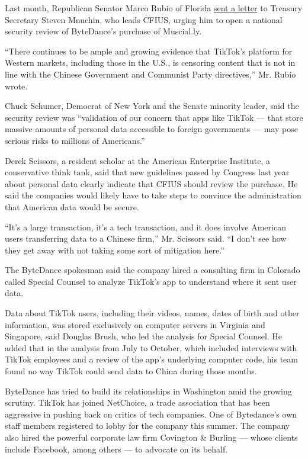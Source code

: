 Last month, Republican Senator Marco Rubio of Florida
\href{https://www.rubio.senate.gov/public/_cache/files/9ba023e4-2f4b-404a-a8c0-e87ea784f440/FCEFFE1F54F3899795B4E5F1F1804630.20191009-letter-to-secretary-mnuchin-re-tiktok.pdf}{sent
a letter} to Treasury Secretary Steven Mnuchin, who leads CFIUS, urging
him to open a national security review of ByteDance's purchase of
Muscial.ly.

``There continues to be ample and growing evidence that TikTok's
platform for Western markets, including those in the U.S., is censoring
content that is not in line with the Chinese Government and Communist
Party directives,'' Mr. Rubio wrote.

Chuck Schumer, Democrat of New York and the Senate minority leader, said
the security review was ``validation of our concern that apps like
TikTok --- that store massive amounts of personal data accessible to
foreign governments --- may pose serious risks to millions of
Americans.''

Derek Scissors, a resident scholar at the American Enterprise Institute,
a conservative think tank, said that new guidelines passed by Congress
last year about personal data clearly indicate that CFIUS should review
the purchase. He said the companies would likely have to take steps to
convince the administration that American data would be secure.

``It's a large transaction, it's a tech transaction, and it does involve
American users transferring data to a Chinese firm,'' Mr. Scissors said.
``I don't see how they get away with not taking some sort of mitigation
here.''

The ByteDance spokesman said the company hired a consulting firm in
Colorado called Special Counsel to analyze TikTok's app to understand
where it sent user data.

Data about TikTok users, including their videos, names, dates of birth
and other information, was stored exclusively on computer servers in
Virginia and Singapore, said Douglas Brush, who led the analysis for
Special Counsel. He added that in the analysis from July to October,
which included interviews with TikTok employees and a review of the
app's underlying computer code, his team found no way TikTok could send
data to China during those months.

ByteDance has tried to build its relationships in Washington amid the
growing scrutiny. TikTok has joined NetChoice, a trade association that
has been aggressive in pushing back on critics of tech companies. One of
Bytedance's own staff members registered to lobby for the company this
summer. The company also hired the powerful corporate law firm Covington
\& Burling --- whose clients include Facebook, among others --- to
advocate on its behalf.


